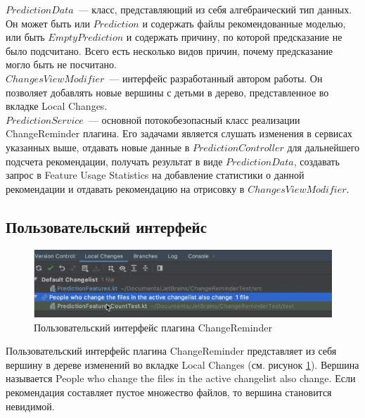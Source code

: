 $PredictionData$~--- класс, представляющий из себя алгебраический тип данных. Он может быть или $Prediction$ и содержать файлы рекомендованные моделью, или быть $EmptyPrediction$ и содержать причину, по которой предсказание не было подсчитано.
Всего есть несколько видов причин, почему предсказание могло быть не посчитано.\\


$ChangesViewModifier$~--- интерфейс разработанный автором работы. Он позволяет добавлять новые вершины с детьми в дерево, представленное во вкладке Local Changes.\\


$PredictionService$~--- основной потокобезопасный класс реализации ChangeReminder плагина. Его задачами является слушать изменения в сервисах указанных выше, отдавать новые данные в $PredictionController$ для дальнейшего подсчета рекомендации, получать результат в виде $PredictionData$, создавать запрос в Feature Usage Statistics на добавление статистики о данной рекомендации и отдавать рекомендацию на отрисовку в $ChangesViewModifier$.
\subsection{Пользовательский интерфейс}
\begin{figure}[!h]
\caption{Пользовательский интерфейс плагина ChangeReminder}\label{ChangeReminder-ui}
\centering
\includegraphics[scale=0.4]{images/ChangeReminderUI.png}
\end{figure}
Пользовательский интерфейс плагина ChangeReminder представляет из себя вершину в дереве изменений во вкладке Local Changes (см. рисунок \ref{ChangeReminder-ui}). Вершина называется People who change the files in the active changelist also change. Если рекомендация составляет пустое множество файлов, то вершина становится невидимой.


